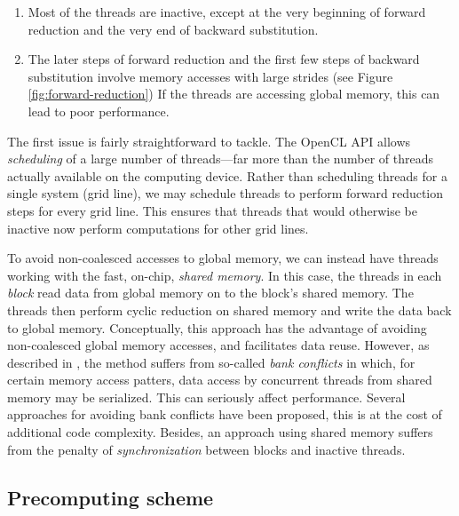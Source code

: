 \documentclass{article}
\begin{document}
        \begin{enumerate}
            \item Most of the threads are inactive,
            except at the very beginning of forward reduction
            and the very end of backward substitution.

            \item The later steps of forward reduction and the first few
            steps of backward substitution involve memory accesses with
            large strides (see Figure \ref{fig:forward-reduction})
            If the threads are accessing global memory,
            this can lead to poor performance.
        \end{enumerate}

        The first issue is fairly straightforward to tackle.
        The OpenCL API allows \emph{scheduling} of a large number of
        threads---far more than the number of threads actually available
        on the computing device.
        Rather than scheduling threads for a single system (grid line),
        we may schedule threads to perform
        forward reduction steps for every grid line.
        This ensures that threads that would otherwise be inactive
        now perform computations for other grid lines.

        To avoid non-coalesced accesses to global memory,
        we can instead have threads working with the fast, on-chip,
        \emph{shared memory}. In this case, the threads in each
        \emph{block} read data from global memory on to the block's
        shared memory.
        The threads then perform cyclic reduction on shared memory
        and write the data back to global memory.
        Conceptually, this approach has the advantage of avoiding
        non-coalesced global memory accesses, and facilitates data reuse.
        However, as described in \cite{Zhang:2010:FTS:1837853.1693472}, the method
        suffers from so-called \emph{bank conflicts} in which,
        for certain memory access patters,
        data access by concurrent threads from shared memory may be serialized.
        This can seriously affect performance.
        Several approaches for avoiding bank conflicts have been proposed,
        this is at the cost of additional code complexity.
        Besides, an approach using shared memory suffers from the penalty
        of \emph{synchronization} between blocks and inactive threads.

    \subsection{Precomputing scheme}
\end{document}
